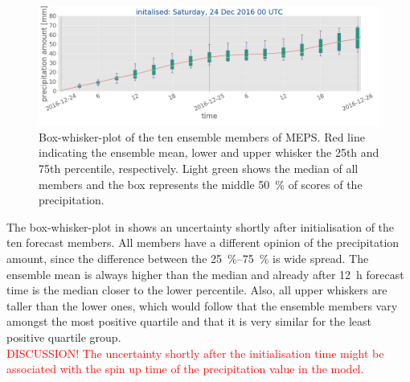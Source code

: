 \begin{figure}[h]
	\includegraphics[width=\textwidth]{./fig_boxplot_sfc/20161224_0}
	\caption{Box-whisker-plot of the ten ensemble members of MEPS. Red line indicating the ensemble mean, lower and upper whisker the 25th and 75th percentile, respectively. Light green shows the median of all members and the box represents the middle \SI{50}{\percent} of scores of the precipitation.}\label{fig:boxplt24}
\end{figure}
The box-whisker-plot in  shows an uncertainty shortly after initialisation of the ten forecast members. All members have a different opinion of the precipitation amount, since the difference between the \SIrange{25}{75}{\percent} is wide spread.
The ensemble mean is always higher than the median and already after \SI{12}{\hour} forecast time is the median closer to the lower percentile. Also, all upper whiskers are taller than the lower ones, which would follow that the ensemble members vary amongst the most positive quartile and that it is very similar for the least positive quartile group.
\\
\textcolor{red}{DISCUSSION! The uncertainty shortly after the initialisation time might be associated with the spin up time of the precipitation value in the model. }

























